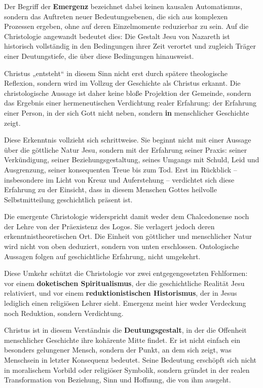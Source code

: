 \documentclass[
]{article}
\begin{document}
Der Begriff der \textbf{Emergenz} bezeichnet dabei keinen kausalen Automatismus, sondern das Auftreten neuer Bedeutungsebenen, die sich aus komplexen Prozessen ergeben, ohne auf deren Einzelmomente reduzierbar zu sein. Auf die Christologie angewandt bedeutet dies: Die Gestalt Jesu von Nazareth ist historisch vollständig in den Bedingungen ihrer Zeit verortet und zugleich Träger einer Deutungstiefe, die über diese Bedingungen hinausweist.

Christus „entsteht`` in diesem Sinn nicht erst durch spätere theologische Reflexion, sondern wird im Vollzug der Geschichte als Christus erkannt. Die christologische Aussage ist daher keine bloße Projektion der Gemeinde, sondern das Ergebnis einer hermeneutischen Verdichtung realer Erfahrung: der Erfahrung einer Person, in der sich Gott nicht neben, sondern \textbf{in} menschlicher Geschichte zeigt.

Diese Erkenntnis vollzieht sich schrittweise. Sie beginnt nicht mit einer Aussage über die göttliche Natur Jesu, sondern mit der Erfahrung seiner Praxis: seiner Verkündigung, seiner Beziehungsgestaltung, seines Umgangs mit Schuld, Leid und Ausgrenzung, seiner konsequenten Treue bis zum Tod. Erst im Rückblick -- insbesondere im Licht von Kreuz und Auferstehung -- verdichtet sich diese Erfahrung zu der Einsicht, dass in diesem Menschen Gottes heilvolle Selbstmitteilung geschichtlich präsent ist.

Die emergente Christologie widerspricht damit weder dem Chalcedonense noch der Lehre von der Präexistenz des Logos. Sie verlagert jedoch deren erkenntnistheoretischen Ort. Die Einheit von göttlicher und menschlicher Natur wird nicht von oben deduziert, sondern von unten erschlossen. Ontologische Aussagen folgen auf geschichtliche Erfahrung, nicht umgekehrt.

Diese Umkehr schützt die Christologie vor zwei entgegengesetzten Fehlformen: vor einem \textbf{doketischen Spiritualismus}, der die geschichtliche Realität Jesu relativiert, und vor einem \textbf{reduktionistischen Historismus}, der in Jesus lediglich einen religiösen Lehrer sieht. Emergenz meint hier weder Verdeckung noch Reduktion, sondern Verdichtung.

Christus ist in diesem Verständnis die \textbf{Deutungsgestalt}, in der die Offenheit menschlicher Geschichte ihre kohärente Mitte findet. Er ist nicht einfach ein besonders gelungener Mensch, sondern der Punkt, an dem sich zeigt, was Menschsein in letzter Konsequenz bedeutet. Seine Bedeutung erschöpft sich nicht in moralischem Vorbild oder religiöser Symbolik, sondern gründet in der realen Transformation von Beziehung, Sinn und Hoffnung, die von ihm ausgeht.
\end{document}
